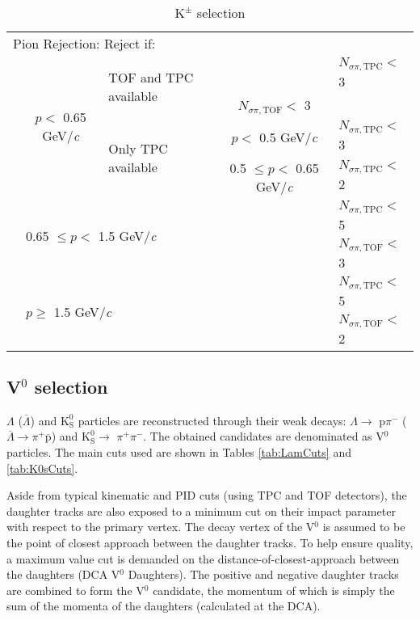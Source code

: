 \documentclass[ALICE,manyauthors]{cernphprep}
\newcommand{\Lam}{$\Lambda$\xspace}
\newcommand{\ALam}{$\overline{\Lambda}$\xspace}
\newcommand{\LamALam}{$\Lambda$ ($\overline{\Lambda}$)\xspace}
\newcommand{\Kpm}{$\mathrm{K^{\pm}}$\xspace}
\newcommand{\Ks}{$\mathrm{K^{0}_{S}}$\xspace}
\newcommand{\Vz}{V$^{0}$\xspace}
\begin{document}
\begin{table}[htbp]
\begin{tabular}{lcc|c|l}
   \multicolumn{5}{l}{Pion Rejection:  Reject if:} \\
   \cline{2-5}
   \multirow{4}{*}{} & \multirow{4}{*}{$p <$ 0.65 GeV/\textit{c}} & \multicolumn{1}{l}{\multirow{2}{*}{TOF and TPC available}} & \multicolumn{1}{c|}{} & $N_{\sigma \pi,\mathrm{TPC}} <$ 3 \\
   \multicolumn{4}{c|}{} & $N_{\sigma \pi,\mathrm{TOF}} <$ 3 \\
   \cline{3-5}
   \multicolumn{2}{c}{} & \multicolumn{1}{l|}{\multirow{2}{*}{Only TPC available}} & $p <$ 0.5 GeV/\textit{c} & $N_{\sigma \pi,\mathrm{TPC}} <$ 3 \\
   \cline{4-5}
   \multicolumn{3}{c|}{} & 0.5 $\leq p <$ 0.65 GeV/\textit{c} & $N_{\sigma \pi,\mathrm{TPC}} <$ 2 \\
   \cline{2-5}
    & \multicolumn{3}{l|}{\multirow{2}{*}{0.65 $\leq p <$ 1.5 GeV/\textit{c}}} & $N_{\sigma \pi,\mathrm{TPC}} <$ 5 \\
    \multicolumn{4}{c|}{} & $N_{\sigma \pi,\mathrm{TOF}} <$ 3 \\
   \cline{2-5}
    & \multicolumn{3}{l|}{\multirow{2}{*}{$p \geq$ 1.5 GeV/\textit{c}}} & $N_{\sigma \pi,\mathrm{TPC}} <$ 5 \\
    \multicolumn{4}{c|}{} & $N_{\sigma \pi,\mathrm{TOF}} <$ 2 \\
   \hline
  \end{tabular}
 \caption{\Kpm selection}
 \label{tab:KchCuts} 
\end{table}


\subsection{\Vz selection}
\label{sec:V0Selection}

\LamALam and \Ks particles are reconstructed through their weak decays: \Lam $\rightarrow$ p$\pi^{-}$ (\ALam $\rightarrow \pi^{+}\overline{\mathrm{p}}$) and \Ks $\rightarrow$ $\pi^{+}\pi^{-}$.
The obtained candidates are denominated as \Vz particles.
The main cuts used are shown in Tables \ref{tab:LamCuts} and \ref{tab:K0sCuts}.

Aside from typical kinematic and PID cuts (using TPC and TOF detectors), the daughter tracks are also exposed to a minimum cut on their impact parameter with respect to the primary vertex.  
The decay vertex of the \Vz is assumed to be the point of closest approach between the daughter tracks.
To help ensure quality, a maximum value cut is demanded on the distance-of-closest-approach between the daughters (DCA \Vz Daughters).
The positive and negative daughter tracks are combined to form the \Vz candidate, the momentum of which is simply the sum of the momenta of the daughters (calculated at the DCA).
\end{document}

